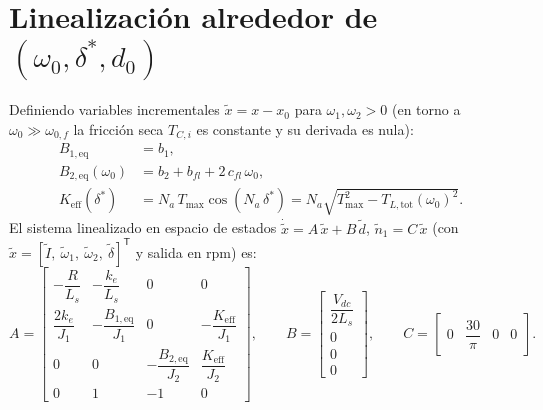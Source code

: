 \documentclass[11pt,a4paper,oneside]{report}
\theoremstyle{definition}
\theoremstyle{remark}
\begin{document}
\section{Linealización alrededor de \texorpdfstring{$(\omega_0,\delta^\ast,d_0)$}{(omega0, delta*, d0)}}
Definiendo variables incrementales $\tilde x = x - x_0$ para $\omega_1,\omega_2 > 0$
(en torno a $\omega_0 \gg \omega_{0,f}$ la fricción seca $T_{C,i}$ es constante y
su derivada es nula):
\begin{align}
  B_{1,\text{eq}} &= b_1, \\
  B_{2,\text{eq}}(\omega_0) &= b_2 + b_{fl} + 2\,c_{fl}\,\omega_0, \\
  K_{\text{eff}}(\delta^\ast) &= N_a\,T_{\max}\cos(N_a\,\delta^\ast)
                               = N_a\sqrt{T_{\max}^2 - T_{L,\text{tot}}(\omega_0)^2}.
\end{align}
El sistema linealizado en espacio de estados $\dot{\tilde x} = A\,\tilde x + B\,\tilde d$,
$\tilde n_1 = C\,\tilde x$ (con $\tilde x = [\tilde I,\ \tilde\omega_1,\ \tilde\omega_2,\ \tilde\delta]^\mathsf{T}$
y salida en rpm) es:
\begin{equation}
  A = \begin{bmatrix}
    -\dfrac{R}{L_s} & -\dfrac{k_e}{L_s} & 0 & 0 \\[6pt]
    \dfrac{2k_e}{J_1} & -\dfrac{B_{1,\text{eq}}}{J_1} & 0 & -\dfrac{K_{\text{eff}}}{J_1} \\[6pt]
    0 & 0 & -\dfrac{B_{2,\text{eq}}}{J_2} & \dfrac{K_{\text{eff}}}{J_2} \\[6pt]
    0 & 1 & -1 & 0
  \end{bmatrix},
  \qquad
  B = \begin{bmatrix}
    \dfrac{V_{dc}}{2L_s} \\[6pt] 0 \\[4pt] 0 \\[4pt] 0
  \end{bmatrix},
  \qquad
  C = \begin{bmatrix} 0 & \dfrac{30}{\pi} & 0 & 0 \end{bmatrix}.
  \label{eq:ss_lineal}
\end{equation}
\end{document}
